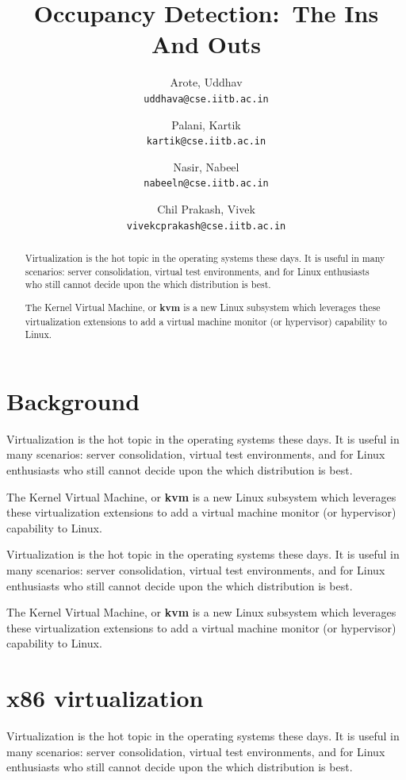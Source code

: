 \documentclass[a4paper,twocolumn,10pt]{article}
\title{Occupancy Detection:\ The Ins And Outs}
\author{
    Arote, Uddhav\\
    \texttt{uddhava@cse.iitb.ac.in}\and
    Palani, Kartik\\
    \texttt{kartik@cse.iitb.ac.in}\and
    Nasir, Nabeel\\
    \texttt{nabeeln@cse.iitb.ac.in}\and
    Chil Prakash, Vivek\\
    \texttt{vivekcprakash@cse.iitb.ac.in}
}
\begin{document}
\maketitle

\begin{abstract}




  Virtualization\cite{HM} is the hot topic in the operating systems 
  these days. It is useful in many scenarios: server consolidation,
  virtual test environments, and for Linux enthusiasts who
  still cannot decide upon the which distribution is best.
  
  \noindent The Kernel Virtual Machine, or \textbf{kvm} is a new Linux
  subsystem which leverages these virtualization extensions
  to add a virtual machine monitor (or hypervisor) capability to Linux.
\end{abstract}

\section{Background}
  Virtualization is the hot topic in the operating systems\cite{WS} 
  these days. It is useful in many scenarios: server consolidation,
  virtual test environments, and for Linux enthusiasts who
  still cannot decide upon the which distribution is best.
  
  \noindent The Kernel Virtual Machine, or \textbf{kvm} is a new Linux
  subsystem which leverages these virtualization extensions
  to add a virtual machine monitor (or hypervisor) capability to Linux.

  
  \noindent Virtualization is the hot topic in the operating systems 
  these days. It is useful in many scenarios: server consolidation,
  virtual test environments, and for Linux enthusiasts who
  still cannot decide upon the which distribution is best.
  
  \noindent The Kernel Virtual Machine, or \textbf{kvm} is a new Linux
  subsystem which leverages these virtualization extensions
  to add a virtual machine monitor (or hypervisor) capability to Linux.

  
\section{x86 virtualization}
Virtualization is the hot topic in the operating systems 
  these days. It is useful in many scenarios: server consolidation,
  virtual test environments, and for Linux enthusiasts who
  still cannot decide upon the which distribution is best.
  
\end{document}
